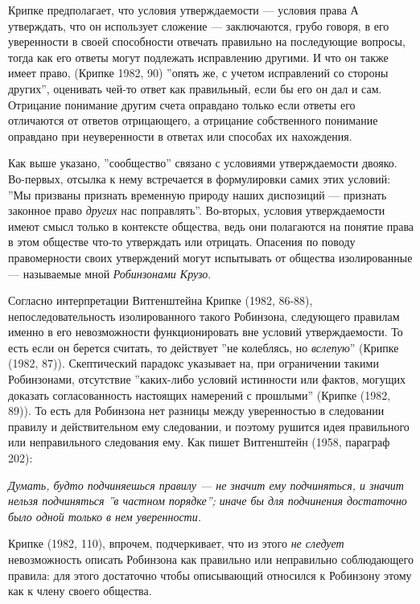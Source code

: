 \documentclass[11pt]{book}
\begin{document}
Крипке предполагает, что условия утверждаемости --- условия права А утверждать, что он использует сложение --- заключаются, грубо говоря, в его уверенности в своей способности отвечать правильно на последующие вопросы, тогда как его ответы могут подлежать исправлению другими. И что он также имеет право, (Крипке 1982, 90) ''опять же, с учетом исправлений со стороны других'', оценивать чей-то ответ как правильный, если бы его он дал и сам. Отрицание понимание другим счета оправдано только если ответы его отличаются от ответов отрицающего, а отрицание собственного понимание оправдано при неуверенности в ответах или способах их нахождения.

Как выше указано, ''сообщество'' связано с условиями утверждаемости двояко. Во-первых, отсылка к нему встречается в формулировки самих этих условий: ''Мы призваны признать временную природу наших диспозиций --- признать законное право \textit{других} нас поправлять''. Во-вторых, условия утверждаемости имеют смысл только в контексте общества, ведь они полагаются на понятие права в этом обществе что-то утверждать или отрицать. Опасения по поводу правомерности своих утверждений могут испытывать от общества изолированные --- называемые мной \textit{Робинзонами Крузо}.

Согласно интерпретации Витгенштейна Крипке (1982, 86-88), непоследовательность изолированного такого Робинзона, следующего правилам именно в его невозможности функционировать вне условий утверждаемости. То есть если он берется считать, то действует ''не колеблясь, но \textit{вслепую}'' (Крипке (1982, 87)). Скептический парадокс указывает на, при ограничении такими Робинзонами, отсутствие ''каких-либо условий истинности или фактов, могущих доказать согласованность настоящих намерений с прошлыми'' (Крипке (1982, 89)). То есть для Робинзона нет разницы между уверенностью в следовании правилу и действительном ему следовании, и поэтому рушится идея правильного или неправильного следования ему. Как пишет Витгенштейн (1958, параграф 202):

\smallskip

\textit{Думать, будто подчиняешься правилу --- не значит ему подчиняться, и значит нельзя подчиняться ''в частном порядке''; иначе бы для подчинения достаточно было одной только в нем уверенности.}

\smallskip

Крипке (1982, 110), впрочем, подчеркивает, что из этого \textit{не следует} невозможность описать Робинзона как правильно или неправильно соблюдающего правила: для этого достаточно чтобы описывающий относился к Робинзону этому как к члену своего общества.
\end{document}
